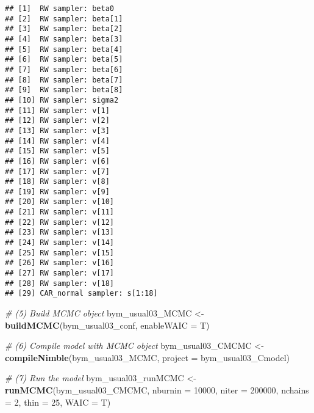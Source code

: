 \documentclass[]{article}
\newenvironment{Shaded}{\begin{snugshade}}{\end{snugshade}}
\newcommand{\CommentTok}[1]{\textcolor[rgb]{0.56,0.35,0.01}{\textit{#1}}}
\newcommand{\DataTypeTok}[1]{\textcolor[rgb]{0.13,0.29,0.53}{#1}}
\newcommand{\DecValTok}[1]{\textcolor[rgb]{0.00,0.00,0.81}{#1}}
\newcommand{\KeywordTok}[1]{\textcolor[rgb]{0.13,0.29,0.53}{\textbf{#1}}}
\newcommand{\NormalTok}[1]{#1}
\newcommand{\OperatorTok}[1]{\textcolor[rgb]{0.81,0.36,0.00}{\textbf{#1}}}
\newcommand{\StringTok}[1]{\textcolor[rgb]{0.31,0.60,0.02}{#1}}
\begin{document}
\begin{Shaded}
\end{Shaded}

\begin{verbatim}
## [1]  RW sampler: beta0
## [2]  RW sampler: beta[1]
## [3]  RW sampler: beta[2]
## [4]  RW sampler: beta[3]
## [5]  RW sampler: beta[4]
## [6]  RW sampler: beta[5]
## [7]  RW sampler: beta[6]
## [8]  RW sampler: beta[7]
## [9]  RW sampler: beta[8]
## [10] RW sampler: sigma2
## [11] RW sampler: v[1]
## [12] RW sampler: v[2]
## [13] RW sampler: v[3]
## [14] RW sampler: v[4]
## [15] RW sampler: v[5]
## [16] RW sampler: v[6]
## [17] RW sampler: v[7]
## [18] RW sampler: v[8]
## [19] RW sampler: v[9]
## [20] RW sampler: v[10]
## [21] RW sampler: v[11]
## [22] RW sampler: v[12]
## [23] RW sampler: v[13]
## [24] RW sampler: v[14]
## [25] RW sampler: v[15]
## [26] RW sampler: v[16]
## [27] RW sampler: v[17]
## [28] RW sampler: v[18]
## [29] CAR_normal sampler: s[1:18]
\end{verbatim}

\begin{Shaded}
\begin{Highlighting}[]
\CommentTok{# (5) Build MCMC object}
\NormalTok{bym_usual03_MCMC <-}\StringTok{ }\KeywordTok{buildMCMC}\NormalTok{(bym_usual03_conf, }\DataTypeTok{enableWAIC =}\NormalTok{ T) }

\CommentTok{# (6) Compile model with MCMC object}
\NormalTok{bym_usual03_CMCMC <-}\StringTok{ }\KeywordTok{compileNimble}\NormalTok{(bym_usual03_MCMC, }\DataTypeTok{project =}\NormalTok{ bym_usual03_Cmodel)  }

\CommentTok{# (7) Run the model}
\NormalTok{bym_usual03_runMCMC <-}\StringTok{ }\KeywordTok{runMCMC}\NormalTok{(bym_usual03_CMCMC, }\DataTypeTok{nburnin =} \DecValTok{10000}\NormalTok{, }\DataTypeTok{niter =} \DecValTok{200000}\NormalTok{, }\DataTypeTok{nchains =} \DecValTok{2}\NormalTok{, }\DataTypeTok{thin =} \DecValTok{25}\NormalTok{, }\DataTypeTok{WAIC =}\NormalTok{ T)}
\end{Highlighting}
\end{Shaded}
\end{document}
